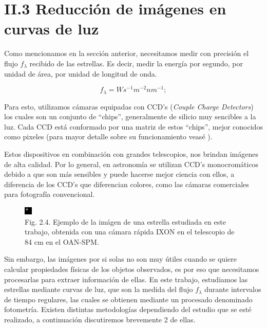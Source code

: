 \section*{II.3 Reducción de imágenes en curvas de luz}

Como mencionamos en la sección anterior, necesitamos medir con precisión el flujo $f_{\lambda}$ recibido de las estrellas. Es decir, medir la energía por segundo, por unidad de área, por unidad de longitud de onda.

\begin{equation}
  \displaystyle f_{\lambda}=W s^{-1}m^{-2}nm^{-1};
\end{equation}

Para esto, utilizamos cámaras equipadas con CCD's (\textit{Couple Charge Detectors}) los cuales son un conjunto de ``chips'', generalmente de silicio muy sencibles a la luz. Cada CCD está conformado por una matriz de estos ``chips'', mejor conocidos como pixeles (para mayor detalle sobre su funcionamiento veasé \cite{mortara1981evaluations}).

Estos dispositivos en combinación con grandes telescopios, nos brindan imágenes de alta calidad. Por lo general, en astronomía se utilizan CCD's monocromáticos debido a que son más sensibles y puede hacerse mejor ciencia con ellos, a diferencia de los CCD's que diferencian colores, como las cámaras comerciales para fotografía convencional.

\begin{figure}[h!]
  \centering
    \includegraphics[scale=8]{./figures/wasp74b.png}
   \caption{Fig. 2.4. Ejemplo de la imágen de una estrella estudiada en este trabajo, obtenida con una cámara rápida IXON en el telescopio de 84 cm en el OAN-SPM.}
    \label{fig_2_4_wasp74b}
\end{figure}

Sin embargo, las imágenes por si solas no son muy útiles cuando se quiere calcular propiedades físicas de los objetos observados, es por eso que necesitamos procesarlas para extraer información de ellas. En este trabajo, estudiamos las estrellas mediante curvas de luz, que son la medida del flujo $f_{\lambda}$ durante intervalos de tiempo regulares, las cuales se obtienen mediante un procesado denominado fotometría. Existen distintas metodologías dependiendo del estudio que se esté realizado, a continuación discutiremos brevemente 2 de ellas.

